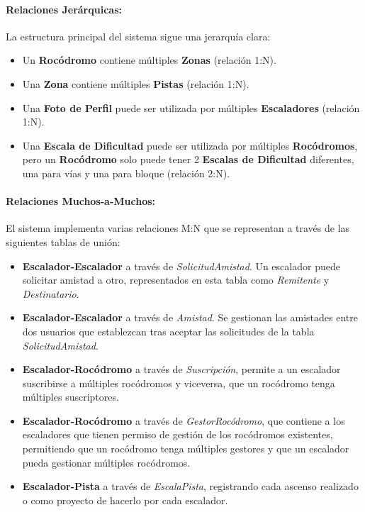 \paragraph{Relaciones Jerárquicas:} La estructura principal del sistema sigue una jerarquía clara:
\begin{itemize}
    \item Un \textbf{Rocódromo} contiene múltiples \textbf{Zonas} (relación 1:N).
     
    \item Una \textbf{Zona} contiene múltiples \textbf{Pistas} (relación 1:N).
     
    \item Una \textbf{Foto de Perfil} puede ser utilizada por múltiples \textbf{Escaladores} (relación 1:N).
     
    \item Una \textbf{Escala de Dificultad} puede ser utilizada por múltiples \textbf{Rocódromos}, pero un \textbf{Rocódromo} solo puede tener 2 \textbf{Escalas de Dificultad} diferentes,
    una para vías y una para bloque (relación 2:N).
\end{itemize}

\paragraph{Relaciones Muchos-a-Muchos:} El sistema implementa varias relaciones M:N que se representan a través de las siguientes tablas de unión:
\begin{itemize}
    \item \textbf{Escalador-Escalador} a través de \textit{SolicitudAmistad}. Un escalador puede solicitar amistad a otro, representados en esta tabla como 
    \textit{Remitente} y \textit{Destinatario}.

    \item \textbf{Escalador-Escalador} a través de \textit{Amistad}. Se gestionan las amistades entre dos usuarios que establezcan tras aceptar
    las solicitudes de la tabla \textit{SolicitudAmistad}.

    \item \textbf{Escalador-Rocódromo} a través de \textit{Suscripción}, permite a un escalador suscribirse a múltiples rocódromos y viceversa, que un rocódromo
    tenga múltiples suscriptores.

    \item \textbf{Escalador-Rocódromo} a través de \textit{GestorRocódromo}, que contiene a los escaladores que tienen permiso de gestión de los rocódromos existentes, 
    permitiendo que un rocódromo tenga múltiples gestores y que un escalador pueda gestionar múltiples rocódromos.

    \item \textbf{Escalador-Pista} a través de \textit{EscalaPista}, registrando cada ascenso realizado o como proyecto de hacerlo por cada escalador.
\end{itemize}

